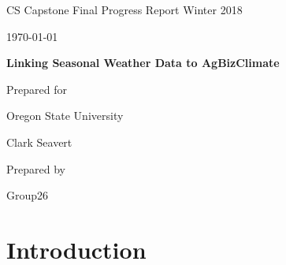 \documentclass[onecolumn, draftclsnofoot,10pt, compsoc]{article}
\def \CapstoneTeamName{AgBizClimate}
\def \CapstoneTeamNumber{26}
\def \GroupMemberOne{}%
\def \CapstoneProjectName{ Linking Seasonal Weather Data to AgBizClimate\texttrademark}
\def \CapstoneSponsorCompany{ Oregon State University}
\def \CapstoneSponsorPerson{ Clark Seavert}
\def \DocType{		%
				Final Progress Report Winter 2018
				}
\newcommand{\NameSigPair}[1]{\par
\makebox[2.75in][r]{#1} \hfil 	\makebox[3.25in]{\makebox[2.25in]{\hrulefill} \hfill		\makebox[.75in]{\hrulefill}}
\par\vspace{-12pt} \textit{\tiny\noindent
\makebox[2.75in]{} \hfil		\makebox[3.25in]{\makebox[2.25in][r]{Signature} \hfill	\makebox[.75in][r]{Date}}}}
\renewcommand{\NameSigPair}[1]{#1}
\begin{document}
\begin{titlepage}
    \begin{singlespace}
        \hfill
        \par\vspace{.2in}
        \centering
        \scshape{
            \huge CS Capstone \DocType \par
            {\large\today}\par
            \vspace{.5in}
            \textbf{\Huge\CapstoneProjectName}\par
            \vfill
            {\large Prepared for}\par
            \Huge \CapstoneSponsorCompany\par
            \vspace{5pt}
            {\Large\NameSigPair{\CapstoneSponsorPerson}\par}
            {\large Prepared by }\par
            Group\CapstoneTeamNumber\par
            \vspace{5pt}
            {\Large
                \NameSigPair{\GroupMemberOne}\par
            }
            \vspace{20pt}
        }
        \begin{abstract}
        \end{abstract}
    \end{singlespace}
\end{titlepage}
\newpage
{}
\tableofcontents
\newpage
\clearpage

\section{Introduction}
\end{document}
